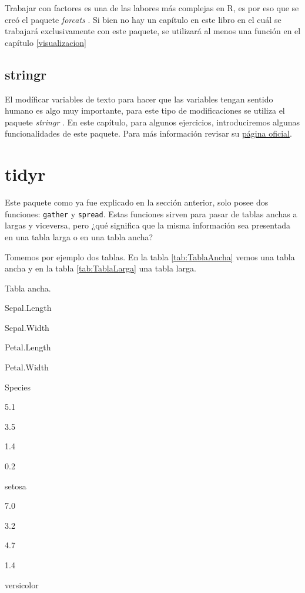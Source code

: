 \documentclass[]{book}
\begin{document}
Trabajar con factores es una de las labores más complejas en R, es por
eso que se creó el paquete \emph{forcats} \citep{Wickhamforcats}. Si
bien no hay un capítulo en este libro en el cuál se trabajará
exclusivamente con este paquete, se utilizará al menos una función en el
capítulo \ref{visualizacion}

\hypertarget{stringr}{%
\subsection{stringr}\label{stringr}}

El modíficar variables de texto para hacer que las variables tengan
sentido humano es algo muy importante, para este tipo de modificaciones
se utiliza el paquete \emph{stringr} \citep{Wickhamstringr}. En este
capítulo, para algunos ejercicios, introduciremos algunas
funcionalidades de este paquete. Para más información revisar su
\href{https://stringr.tidyverse.org/}{página oficial}.

\hypertarget{tidyr-1}{%
\section{tidyr}\label{tidyr-1}}

Este paquete como ya fue explicado en la sección anterior, solo posee
dos funciones: \texttt{gather} y \texttt{spread}. Estas funciones sirven
para pasar de tablas anchas a largas y viceversa, pero ¿qué significa
que la misma información sea presentada en una tabla larga o en una
tabla ancha?

Tomemos por ejemplo dos tablas. En la tabla \ref{tab:TablaAncha} vemos
una tabla ancha y en la tabla \ref{tab:TablaLarga} una tabla larga.

\label{tab:TablaAncha}Tabla ancha.

Sepal.Length

Sepal.Width

Petal.Length

Petal.Width

Species

5.1

3.5

1.4

0.2

setosa

7.0

3.2

4.7

1.4

versicolor
\end{document}

